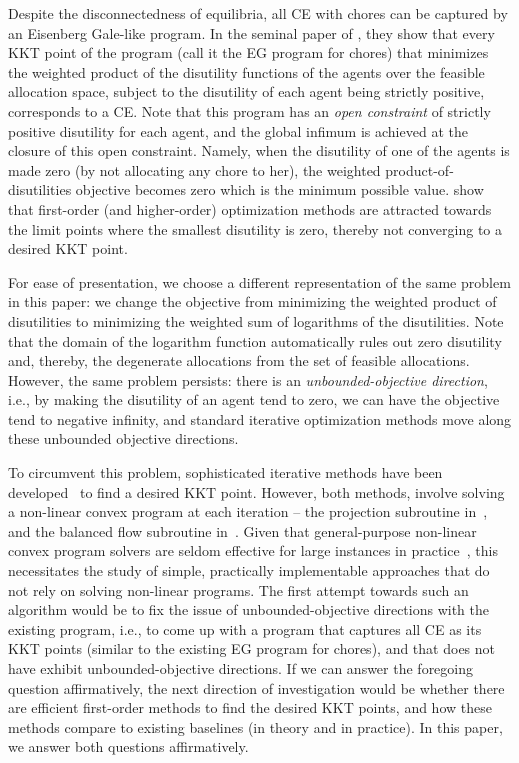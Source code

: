 \documentclass[format=acmsmall,authorversion]{acmart}
\newcommand{\infd}{unbounded-objective direction}
\begin{document}
Despite the disconnectedness of equilibria, all CE with chores can be captured by an Eisenberg Gale-like program. In the seminal paper of \citet{BogomolnaiaMSY17}, they show that every KKT point of the program (call it the EG program for chores) that minimizes the weighted product of the disutility functions of the agents over the feasible allocation space, subject to the disutility of each agent being strictly positive, corresponds to a CE. Note that this program has an \emph{open constraint} of strictly positive disutility for each agent, and the global infimum is achieved at the closure of this open constraint. Namely, when the disutility of one of the agents is made zero (by not allocating any chore to her), the weighted product-of-disutilities objective becomes zero which is the minimum possible value. 
\citet{boodaghians2022polynomial} show that first-order (and higher-order) optimization methods are attracted towards the limit points where the smallest disutility is zero, thereby not converging to a desired KKT point. 

\medskip

 For ease of presentation, we choose a different representation of the same problem in this paper: we change the objective from minimizing the weighted product of disutilities to minimizing the weighted sum of logarithms of the disutilities. Note that the domain of the logarithm function automatically rules out zero disutility and, thereby, the degenerate allocations from the set of feasible allocations. However, the same problem persists: there is an \emph{\infd}, i.e., by making the disutility of an agent tend to zero, we can have the objective tend to negative infinity, and standard iterative optimization methods move along these unbounded objective directions. 

To circumvent this problem, sophisticated iterative methods have been developed~\cite{boodaghians2022polynomial, ChaudhuryGMM22} to find a desired KKT point. However, both methods, involve solving a non-linear convex program at each iteration -- the projection subroutine in~\cite{boodaghians2022polynomial}, and the balanced flow subroutine in~\cite{ChaudhuryGMM22}. Given that general-purpose non-linear convex program solvers are seldom effective for large instances in practice~\cite{charkhgard2018linear}, this necessitates the study of simple, practically implementable approaches that do not rely on solving non-linear programs. The first attempt towards such an algorithm would be to fix the issue of \infd s with the existing program, i.e., to come up with a program that captures all CE as its KKT points (similar to the existing EG program for chores), and that does not have exhibit \infd s. If we can answer the foregoing question affirmatively, the next direction of investigation would be whether there are efficient first-order methods to find the desired KKT points, and how these methods compare to existing baselines (in theory and in practice). In this paper, we answer both questions affirmatively. 
\end{document}
